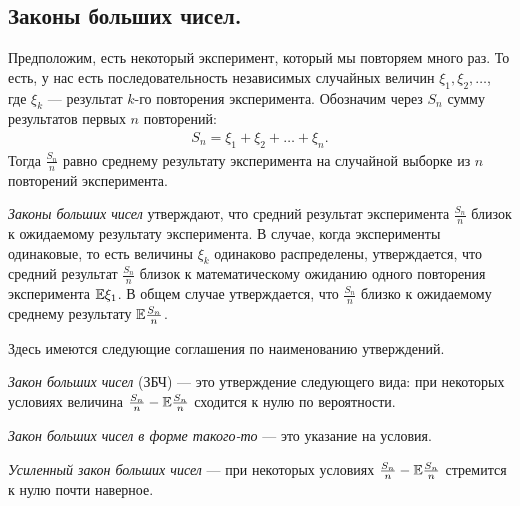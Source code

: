 \documentclass[../main.tex]{subfiles}
\begin{document}
\subsection{Законы больших чисел.}
\label{subsection:law_of_large_numbers}

Предположим, есть некоторый эксперимент, который мы повторяем много раз. То есть, у нас есть последовательность независимых случайных величин $ \xi_1,\xi_2, \ldots $, где $ \xi_k $ --- результат $ k $-го повторения эксперимента. Обозначим через $ S_n $ сумму результатов первых  $ n $  повторений:
\begin{align*}
 S_n = \xi_1 + \xi_2+\ldots+\xi_n.
\end{align*} Тогда $ \frac{S_n}{n} $ равно среднему результату эксперимента на случайной выборке из $ n $  повторений эксперимента.

\textit{Законы больших чисел} утверждают, что средний результат эксперимента $ \frac{S_n}{n} $ близок к ожидаемому результату эксперимента. В случае, когда эксперименты одинаковые, то есть величины $ \xi_k $ одинаково распределены, утверждается, что средний результат  $ \frac{S_n}{n} $  близок к математическому ожиданию одного повторения эксперимента $ \mathbb E \xi_1 $. В общем случае утверждается, что $ \frac{S_n}{n} $ близко к ожидаемому среднему результату $ \mathbb E \frac{S_n}{n} $.

Здесь имеются следующие соглашения по наименованию утверждений.

\textit{Закон больших чисел} (ЗБЧ) --- это утверждение следующего вида: при некоторых условиях величина $ \frac{S_n}{n}-\mathbb E \frac{S_n}{n} $ сходится к нулю по вероятности.

\textit{Закон больших чисел в форме такого-то} --- это указание на условия.

\textit{Усиленный закон больших чисел} --- при некоторых условиях $ \frac{S_n}{n}-\mathbb E \frac{S_n}{n} $ стремится к нулю почти наверное.
\end{document}
